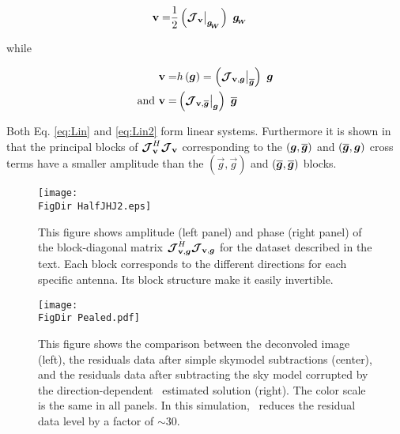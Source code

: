 \begin{alignat}{2}
\label{eq:Lin}
\textbf{v}=&\frac{1}{2}\left(\bm{\mathcal{J}}_{\textbf{v}}\big|_{\bm{g_{\!_{W}}}}\right)\ \bm{g_{\!_{W}}}
\end{alignat}

\noindent while

\begin{alignat}{2}
\label{eq:Lin2}
\vis=&h\left(\vec{g}\right)=\left(\JVg\big|_{\conj{\g}}\right)\ \g\\
\text{and }\vis=&\left(\JVCg\big|_{\g}\right)\ \conj{\g}
\end{alignat}



Both Eq. \ref{eq:Lin} and \ref{eq:Lin2} form linear
systems. Furthermore it is shown in \citet[][]{SmirnovTasse14}
that the principal blocks of $\bm{\mathcal{J}}_{\textbf{v}}^H\bm{\mathcal{J}}_{\textbf{v}}$ corresponding to the
$(\vec{g},\conj{\vec{g}})$ and $(\conj{\vec{g}},\vec{g})$ cross
terms have a smaller amplitude than the $(\vec{g},\vec{g})$ and
$(\conj{\vec{g}},\conj{\vec{g}})$ blocks.


\begin{figure}[h!]
\begin{center}
\texttt{[image: \\FigDir HalfJHJ2.eps]}
\caption{\label{fig:HalfJHJ} This figure shows amplitude (left panel)
  and phase (right panel) of the block-diagonal matrix $\bm{\mathcal{J}}_{\textbf{v},\bm{g}}^H\bm{\mathcal{J}}_{\textbf{v},\bm{g}}$
  for the dataset described in the text. Each block corresponds to the
different directions for each specific antenna. Its block structure
make it easily invertible.}
\end{center}
\end{figure}

\begin{figure*}[t!]
\begin{center}
\texttt{[image: \\FigDir Pealed.pdf]}
\caption{\label{fig:resid} This figure shows the comparison between
  the deconvoled image
  (left), the residuals data after simple skymodel subtractions
  (center), and the residuals data after subtracting the
  sky model corrupted by the direction-dependent \COH~estimated solution
  (right). The color scale is the same in all panels. In this
  simulation, \COH~reduces the
residual data level by a factor of $\sim30$.}
\end{center}
\end{figure*}


